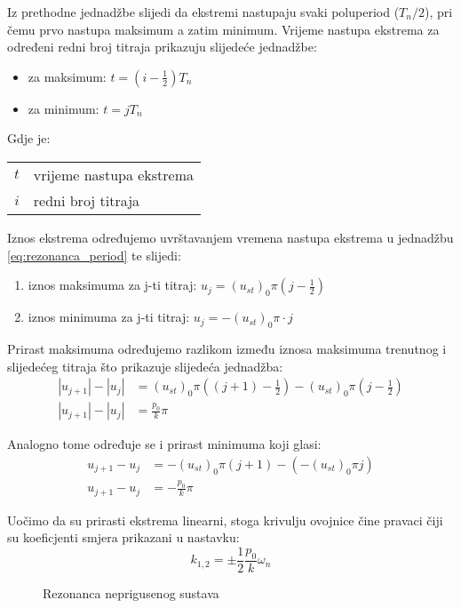 Iz prethodne jednadžbe slijedi da ekstremi nastupaju svaki poluperiod ($T_n/2$), pri
čemu prvo nastupa maksimum a zatim minimum. Vrijeme nastupa ekstrema za određeni
redni broj titraja prikazuju slijedeće jednadžbe:
\begin{itemize}
    \item za maksimum: $t=(i-\frac{1}{2})T_n$
    \item za minimum: $t=jT_n$
\end{itemize}
Gdje je:
\begin{table}[H]
    \begin{tabular} {r l}
        $t$ & vrijeme nastupa ekstrema\\
        $i$ & redni broj titraja\\
    \end{tabular}
\end{table}
Iznos ekstrema određujemo uvrštavanjem vremena nastupa ekstrema u jednadžbu
\eqref{eq:rezonanca_period} te slijedi:
\begin{enumerate}
    \item iznos maksimuma za j-ti titraj: $u_j=(u_{st})_0\pi(j-\frac{1}{2})$
    \item iznos minimuma za j-ti titraj: $u_j=-(u_{st})_0\pi\cdot j$ 
\end{enumerate}

Prirast maksimuma određujemo razlikom između iznosa maksimuma trenutnog i slijedećeg
titraja što prikazuje slijedeća jednadžba:
\begin{equation}\label{eq:prirast_maksimuma}
    \begin{split}
        |u_{j+1}|-|u_j| &=(u_{st})_0\pi((j+1)-\frac{1}{2})-(u_{st})_0\pi(j-\frac{1}{2})\\
        |u_{j+1}|-|u_j| &= \frac{p_0}{k}\pi
    \end{split}
\end{equation}

Analogno tome određuje se i prirast minimuma koji glasi:
\begin{equation}\label{eq:prirast_minimuma}
    \begin{split}
        u_{j+1}-u_j &= -(u_{st})_0\pi(j+1)-(-(u_{st})_0\pi j)\\
        u_{j+1}-u_j &= -\frac{p_0}{k}\pi
    \end{split}
\end{equation}

Uočimo da su prirasti ekstrema linearni, stoga krivulju ovojnice čine pravaci čiji
su koeficjenti smjera prikazani u nastavku:
\begin{equation}\label{eq:koef_smjera_envelopa}
    k_{1,2}=\pm\frac{1}{2}\frac{p_0}{k}\omega_n
\end{equation}

\begin{figure}[H]
    
    \label{rezonanca-nepriguseno}
    \caption{Rezonanca neprigusenog sustava}
\end{figure}


